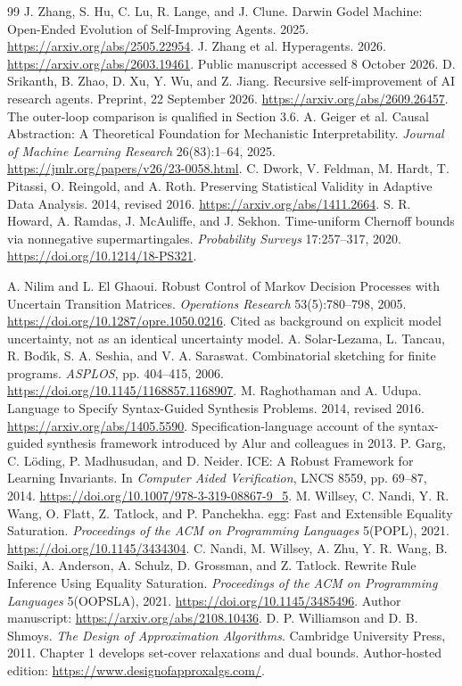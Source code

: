 \documentclass[11pt,letterpaper]{article}
\theoremstyle{plain}
\theoremstyle{definition}
\begin{document}
\begin{thebibliography}{99}
 J. Zhang, S. Hu, C. Lu, R. Lange, and J. Clune. Darwin Godel Machine: Open-Ended Evolution of Self-Improving Agents. 2025. \url{https://arxiv.org/abs/2505.22954}.
 J. Zhang et al. Hyperagents. 2026. \url{https://arxiv.org/abs/2603.19461}. Public manuscript accessed 8 October 2026.
 D. Srikanth, B. Zhao, D. Xu, Y. Wu, and Z. Jiang. Recursive self-improvement of AI research agents. Preprint, 22 September 2026. \url{https://arxiv.org/abs/2609.26457}. The outer-loop comparison is qualified in Section 3.6.
 A. Geiger et al. Causal Abstraction: A Theoretical Foundation for Mechanistic Interpretability. \emph{Journal of Machine Learning Research} 26(83):1--64, 2025. \url{https://jmlr.org/papers/v26/23-0058.html}.
 C. Dwork, V. Feldman, M. Hardt, T. Pitassi, O. Reingold, and A. Roth. Preserving Statistical Validity in Adaptive Data Analysis. 2014, revised 2016. \url{https://arxiv.org/abs/1411.2664}.
 S. R. Howard, A. Ramdas, J. McAuliffe, and J. Sekhon. Time-uniform Chernoff bounds via nonnegative supermartingales. \emph{Probability Surveys} 17:257--317, 2020. \url{https://doi.org/10.1214/18-PS321}.

 A. Nilim and L. El Ghaoui. Robust Control of Markov Decision Processes with Uncertain Transition Matrices. \emph{Operations Research} 53(5):780--798, 2005. \url{https://doi.org/10.1287/opre.1050.0216}. Cited as background on explicit model uncertainty, not as an identical uncertainty model.
 A. Solar-Lezama, L. Tancau, R. Bod\'{\i}k, S. A. Seshia, and V. A. Saraswat. Combinatorial sketching for finite programs. \emph{ASPLOS}, pp. 404--415, 2006. \url{https://doi.org/10.1145/1168857.1168907}.
 M. Raghothaman and A. Udupa. Language to Specify Syntax-Guided Synthesis Problems. 2014, revised 2016. \url{https://arxiv.org/abs/1405.5590}. Specification-language account of the syntax-guided synthesis framework introduced by Alur and colleagues in 2013.
 P. Garg, C. L\"oding, P. Madhusudan, and D. Neider. ICE: A Robust Framework for Learning Invariants. In \emph{Computer Aided Verification}, LNCS 8559, pp. 69--87, 2014. \url{https://doi.org/10.1007/978-3-319-08867-9_5}.
 M. Willsey, C. Nandi, Y. R. Wang, O. Flatt, Z. Tatlock, and P. Panchekha. egg: Fast and Extensible Equality Saturation. \emph{Proceedings of the ACM on Programming Languages} 5(POPL), 2021. \url{https://doi.org/10.1145/3434304}.
 C. Nandi, M. Willsey, A. Zhu, Y. R. Wang, B. Saiki, A. Anderson, A. Schulz, D. Grossman, and Z. Tatlock. Rewrite Rule Inference Using Equality Saturation. \emph{Proceedings of the ACM on Programming Languages} 5(OOPSLA), 2021. \url{https://doi.org/10.1145/3485496}. Author manuscript: \url{https://arxiv.org/abs/2108.10436}.
 D. P. Williamson and D. B. Shmoys. \emph{The Design of Approximation Algorithms}. Cambridge University Press, 2011. Chapter 1 develops set-cover relaxations and dual bounds. Author-hosted edition: \url{https://www.designofapproxalgs.com/}.
\end{thebibliography}
\end{document}
